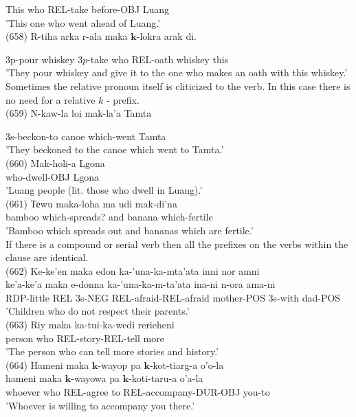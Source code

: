 \documentclass[10pt]{article}
\begin{document}
This who REL-take before-OBJ Luang\\
'This one who went ahead of Luang.'\\
(658) R-tiha arka r-ala maka \(\boldsymbol{k}\)-lokra arak di.

3p-pour whiskey \(3 p\)-take who REL-oath whiskey this\\
'They pour whiskey and give it to the one who makes an oath with this whiskey.'\\
Sometimes the relative pronoun itself is cliticized to the verb. In this case there is no need for a relative \(k\) - prefix.\\
(659) N-kaw-la loi mak-la'a Tamta

3s-beckon-to canoe which-went Tamta\\
'They beckoned to the canoe which went to Tamta.'\\
(660) Mak-holi-a Lgona\\
who-dwell-OBJ Lgona\\
'Luang people (lit. those who dwell in Luang).'\\
(661) Теwu maka-loha ma udi mak-di'na\\
bamboo which-spreads? and banana which-fertile\\
'Bamboo which spreads out and bananas which are fertile.'\\
If there is a compound or serial verb then all the prefixes on the verbs within the clause are identical.\\
(662) Ke-ke'en maka edon ka-'una-ka-mta'ata inni nor amni\\
ke'a-ke'a maka e-donna ka-'una-ka-m-ta'ata ina-ni n-ora ama-ni\\
RDP-little REL 3s-NEG REL-afraid-REL-afraid mother-POS 3s-with dad-POS\\
'Children who do not respect their parents.'\\
(663) Riy maka ka-tui-ka-wedi rerieheni\\
person who REL-story-REL-tell more\\
'The person who can tell more stories and history.'\\
(664) Hameni maka \(\boldsymbol{k}\)-wayop pa \(\boldsymbol{k}\)-kot-tiarg-a o'o-la\\
hameni maka \(\boldsymbol{k}\)-wayowa pa \(\boldsymbol{k}\)-koti-taru-a o'a-la\\
whoever who REL-agree to REL-accompany-DUR-OBJ you-to\\
'Whoever is willing to accompany you there.'\\
\end{document}
